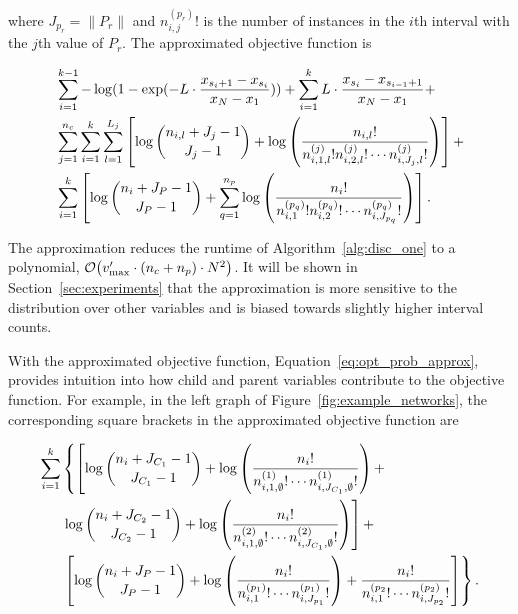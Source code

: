 \noindent
where $J_{p_r} = \| P_r\|$ and ${n^{(p_r)}_{i,j} !}$ is the number of instances in the $i$th interval with the $j$th value of $P_r$.
The approximated objective function is

\begin{small}
\begin{equation}
\begin{aligned}
\label{eq:opt_prob_approx}
& \sum_{i=1}^{k-1} - \log(1 - {\exp(- L \cdot {{x_{s_i+1} - x_{s_i}}\over{x_N - x_1}})}) +  \sum_{i=1}^{k} L \cdot {{x_{s_{i}} - x_{s_{i-1} + 1}}\over{x_N - x_1}} +\\
&  \sum_{j=1}^{n_c} \sum_{i=1}^{k}  \sum_{l=1}^{L_j} \left[  \log{{n_{i,l} + J_j - 1}\choose{J_j-1}} + \log \left( { {{n_{i,l}}!}\over{ {n^{(j)}_{i,1,l} !} {n^{(j)}_{i,2,l} !} \cdots {n^{(j)}_{i,J_j,l} !}} } \right) \right] + \\
& \sum_{i=1}^k \left[  \log {{n_{i} + J_P - 1}\choose{J_P-1}} + \sum_{q=1}^{n_p} \log \left( { {{{n}_i}!}\over{ {n^{(p_q)}_{i,1} !} {n^{(p_q)}_{i,2} !} \cdots {n^{(p_q)}_{i,J_{p_q}} !}}} \right) \right]\text{.}
\end{aligned}
\end{equation}
\end{small}

The approximation reduces the runtime of Algorithm~\ref{alg:disc_one} to a polynomial, $\bigo\paren{ {v'_\text{max}} \cdot (n_c + n_p) \cdot N^2}$.
It will be shown in Section~\ref{sec:experiments} that the approximation is more sensitive to the distribution over other variables and is biased towards slightly higher interval counts.

With the approximated objective function, Equation~\ref{eq:opt_prob_approx}, provides intuition into how child and parent variables contribute to the objective function.
For example, in the left graph of Figure~\ref{fig:example_networks}, the corresponding square brackets in the approximated objective function are

\begin{small}
\begin{equation}
\begin{aligned}
\label{eq:example_approx}
 \sum_{i=1}^k & \left\lbrace   \left[ \log{{n_{i} + J_{C_1} - 1}\choose{J_{C_1}-1}} + \log \left(  {{{n_i}!} \over { {n^{(1)}_{i,1,\emptyset} !} \cdots {n^{(1)}_{i,J_{C_1},\emptyset} !}} }  \right)  +  \right. \right.\\
& \left.  \log{{n_{i} + J_{C_2} - 1}\choose{J_{C_2}-1}} + \log \left(  {{{n_i}!} \over { {n^{(2)}_{i,1,\emptyset} !} \cdots {n^{(2)}_{i,J_{C_1},\emptyset} !}} }  \right)  \right] + \\
&  \left. \left[  \log {{n_{i} + J_P - 1}\choose{J_P-1}} +  \log \left( { {{{n}_i}!}\over{ {n^{(p_1)}_{i,1} !}\cdots {n^{(p_1)}_{i,J_{p_1}} !}}} \right) +{ {{{n}_i}!}\over{ {n^{(p_2}_{i,1} !}\cdots {n^{(p_2)}_{i,J_{p_2}} !}}}  \right] \right\rbrace \text{.}
\end{aligned}
\end{equation}
\end{small}

